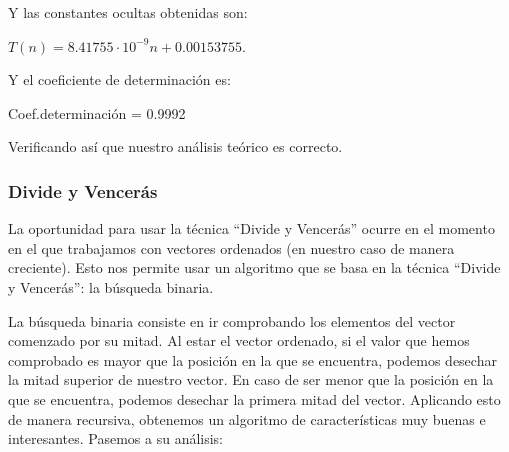 \documentclass[10pt,a4paper]{article}
\begin{document}
\begin{enumerate}
	Y las constantes ocultas obtenidas son:
	
	\( T(n) = 8.41755 \cdot 10^{-9} n + 0.00153755\).
	
	Y el coeficiente de determinación es:
	
	Coef.determinación = 0.9992
	
	Verificando así que nuestro análisis teórico es correcto.
\end{enumerate}

\subsubsection{Divide y Vencerás}
La oportunidad para usar la técnica ``Divide y Vencerás'' ocurre en el momento en el que trabajamos con vectores ordenados (en nuestro caso de manera creciente). Esto nos permite usar un algoritmo que se basa en la técnica ``Divide y Vencerás'': la búsqueda binaria.

La búsqueda binaria consiste en ir comprobando los elementos del vector comenzado por su mitad. Al estar el vector ordenado, si el valor que hemos comprobado es mayor que la posición en la que se encuentra, podemos desechar la mitad superior de nuestro vector. En caso de ser menor que la posición en la que se encuentra, podemos desechar la primera mitad del vector.  Aplicando esto de manera recursiva, obtenemos un algoritmo de características muy buenas e interesantes. Pasemos a su análisis:
\end{document}
